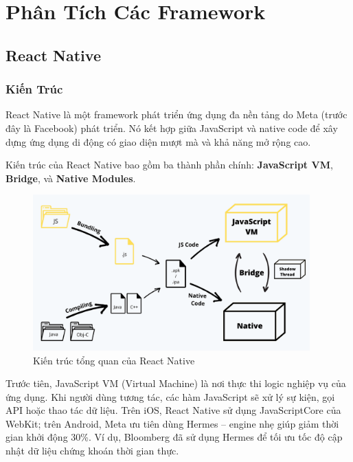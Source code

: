 \section{Phân Tích Các Framework}

\subsection{React Native}
\renewcommand{\labelitemi}{--}    
\subsubsection{Kiến Trúc}

\begin{sloppypar}
\hspace*{1.5em}React Native là một framework phát triển ứng dụng đa nền tảng do Meta (trước đây là Facebook) phát triển.  
Nó kết hợp giữa JavaScript và native code để xây dựng ứng dụng di động có giao diện mượt mà và khả năng mở rộng cao.
\end{sloppypar}

\begin{sloppypar}
Kiến trúc của React Native bao gồm ba thành phần chính: \textbf{JavaScript VM}, \textbf{Bridge}, và \textbf{Native Modules}.
\end{sloppypar}

\begin{figure}[H]
    \centering
    \includegraphics[width=0.95\textwidth]{images/react_native.png}
    \caption{Kiến trúc tổng quan của React Native}
\end{figure}

\begin{sloppypar}
Trước tiên, JavaScript VM (Virtual Machine) là nơi thực thi logic nghiệp vụ của ứng dụng.  
Khi người dùng tương tác, các hàm JavaScript sẽ xử lý sự kiện, gọi API hoặc thao tác dữ liệu.  
Trên iOS, React Native sử dụng JavaScriptCore của WebKit; trên Android, Meta ưu tiên dùng Hermes – engine nhẹ giúp giảm thời gian khởi động 30\%.  
Ví dụ, Bloomberg đã sử dụng Hermes để tối ưu tốc độ cập nhật dữ liệu chứng khoán thời gian thực.
\end{sloppypar}

